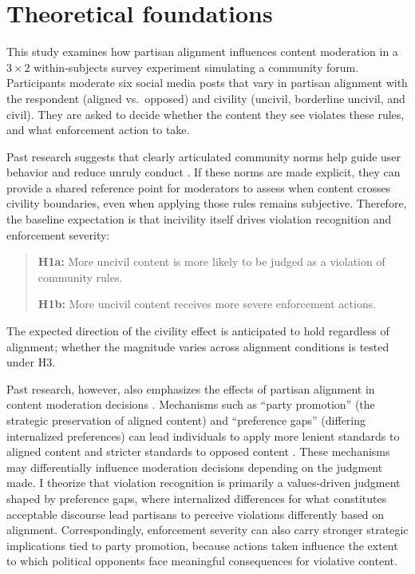 \documentclass[12pt]{article}
\begin{document}
\section{Theoretical foundations}

This study examines how partisan alignment influences content moderation in a $3\times2$ within-subjects survey experiment simulating a community forum. Participants moderate six social media posts that vary in partisan alignment with the respondent (aligned vs.\ opposed) and civility (uncivil, borderline uncivil, and civil). They are asked to decide whether the content they see violates these rules, and what enforcement action to take.

Past research suggests that clearly articulated community norms help guide user behavior and reduce unruly conduct \parencite{matiasCivicLaborVolunteer2019,leibmannRedditRulesRulers2025}. If these norms are made explicit, they can provide a shared reference point for moderators to assess when content crosses civility boundaries, even when applying those rules remains subjective. Therefore, the baseline expectation is that incivility itself drives violation recognition and enforcement severity:

\begin{quote}
\textbf{H1a:} More uncivil content is more likely to be judged as a violation of community rules.

\textbf{H1b:} More uncivil content receives more severe enforcement actions.
\end{quote}

The expected direction of the civility effect is anticipated to hold regardless of alignment; whether the magnitude varies across alignment conditions is tested under H3.

Past research, however, also emphasizes the effects of partisan alignment in content moderation decisions \parencite{lindnerAlienableSpeechIdeological2009,appelPartisanConflictContent2023a,kozyrevaResolvingContentModeration2023,solomonIllusoryInterpartyDisagreement2024}. Mechanisms such as \enquote{party promotion} (the strategic preservation of aligned content) and \enquote{preference gaps} (differing internalized preferences) can lead individuals to apply more lenient standards to aligned content and stricter standards to opposed content \parencite{appelPartisanConflictContent2023a}. These mechanisms may differentially influence moderation decisions depending on the judgment made. I theorize that violation recognition is primarily a values-driven judgment shaped by preference gaps, where internalized differences for what constitutes acceptable discourse lead partisans to perceive violations differently based on alignment. Correspondingly, enforcement severity can also carry stronger strategic implications tied to party promotion, because actions taken influence the extent to which political opponents face meaningful consequences for violative content.
\end{document}

